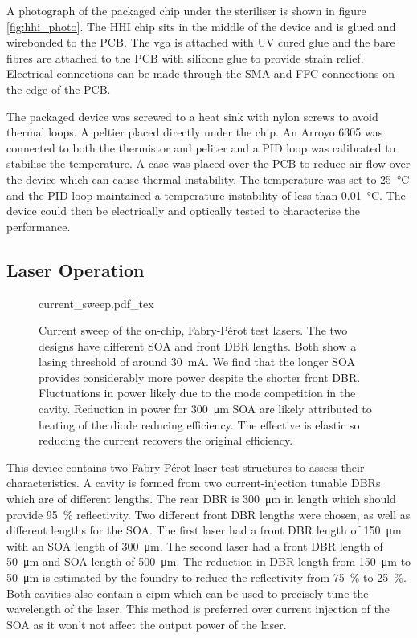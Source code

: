 A photograph of the packaged chip under the steriliser is shown in figure \ref{fig:hhi_photo}. The HHI chip sits in the middle of the device and is glued and wirebonded to the PCB. The \ac{vga} is attached with UV cured glue and the bare fibres are attached to the PCB with silicone glue to provide strain relief. Electrical connections can be made through the SMA and FFC connections on the edge of the PCB.

The packaged device was screwed to a heat sink with nylon screws to avoid thermal loops. A peltier placed directly under the chip. An Arroyo 6305 was connected to both the thermistor and peliter and a PID loop was calibrated to stabilise the temperature. A case was placed over the PCB to reduce air flow over the device which can cause thermal instability. The temperature was set to \SI{25}{\celsius} and the PID loop maintained a temperature instability of less than \SI{0.01}{\celsius}. The device could then be electrically and optically tested to characterise the performance.

\subsection{Laser Operation}

\begin{figure}[t]
	\centering
	\small	
	\def\svgwidth{\textwidth} 
	{current_sweep.pdf_tex}
	\caption[Current sweep of the HHI Fabry-P\'{e}rot test lasers]{Current sweep of the on-chip, Fabry-P\'{e}rot test lasers. The two designs have different \ac{SOA} and front \ac{DBR} lengths. Both show a lasing threshold of around \SI{30}{\mA}. We find that the longer \ac{SOA} provides considerably more power despite the shorter front \ac{DBR}. Fluctuations in power likely due to the mode competition in the cavity. Reduction in power for \SI{300}{\um} \ac{SOA} are likely attributed to heating of the diode reducing efficiency. The effective is elastic so reducing the current recovers the original efficiency.}
	\label{fig:hhi_soa_sweep}
\end{figure}

This device contains two Fabry-P\'{e}rot laser test structures to assess their characteristics. A cavity is formed from two current-injection tunable \acp{DBR} which are of different lengths. The rear \ac{DBR} is \SI{300}{\um} in length which should provide \SI{95}{\percent} reflectivity. Two different front \ac{DBR} lengths were chosen, as well as different lengths for the \ac{SOA}. The first laser had a front \ac{DBR} length of \SI{150}{\um} with an \ac{SOA} length of \SI{300}{\um}. The second laser had a front \ac{DBR} length of \SI{50}{\um} and \ac{SOA} length of \SI{500}{\um}. The reduction in \ac{DBR} length from \SI{150}{\um} to \SI{50}{\um} is estimated by the foundry to reduce the reflectivity from \SI{75}{\percent} to \SI{25}{\percent}. Both cavities also contain a \ac{cipm} which can be used to precisely tune the wavelength of the laser. This method is preferred over current injection of the \ac{SOA} as it won't not affect the output power of the laser.

